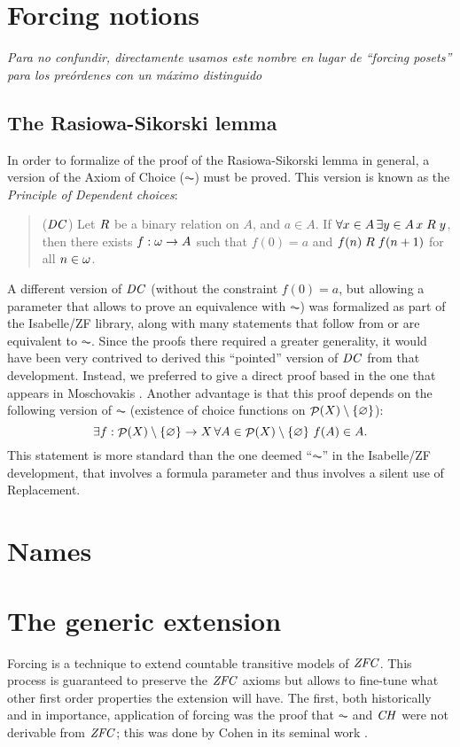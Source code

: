 \documentclass[9pt]{entcs} \usepackage{entcsmacro}
\begin{document}
\section{Forcing notions}\label{sec:forcing-posets}
\textit{Para no confundir, directamente usamos este nombre en lugar de
  ``forcing posets'' para los preórdenes con un máximo distinguido}

\subsection{The Rasiowa-Sikorski lemma}
In order to formalize of the proof of the Rasiowa-Sikorski lemma in
general, a version of the Axiom of Choice ($\AC$) must be proved. This
version is known as the \emph{Principle of Dependent choices}:
\begin{quote}
  ($\mathit{DC}$) Let $\mathrel{R}$ be a binary relation on $A$, and $a\in A$. If
  $\forall x\in A\,  \exists y\in A\, x\mathrel{R} y$, then there exists
  $f:\omega\to A$ such that $f(0)=a$ and $f(n)\mathrel{R} f(n+1)$ for all
  $n\in\omega$.
\end{quote}

A different version of $\mathit{DC}$ (without the constraint $f(0)=a$, but
allowing a parameter that allows to prove an equivalence with $\AC$) was
formalized as part of the Isabelle/ZF library, along with many
statements that follow from or are equivalent to $\AC$. Since the
proofs there required a greater generality, it would have been very
contrived to derived this ``pointed'' version of $\mathit{DC}$ from that
development. Instead, we preferred to give a direct proof based in the
one that appears in Moschovakis \cite{moschovakis1994notes}. Another
advantage is that this proof depends on the following version of $\AC$
(existence of choice functions on $\mathop{\mathcal{P}}(X)\setminus \{\varnothing\}$):
\[
\exists f:\mathop{\mathcal{P}}(X)\setminus \{\varnothing\}\to X \, \forall A\in \mathop{\mathcal{P}}(X)\setminus \{\varnothing\}\ f(A)
    \in A.
\]
This statement is more standard than the one deemed ``$\AC$'' in the
Isabelle/ZF development, that involves a formula parameter and thus
involves a silent use of Replacement.


\section{Names}


\section{The generic extension}
Forcing is a technique to extend countable transitive models of
$\mathit{ZFC}$. This process is guaranteed to preserve the $\mathit{ZFC}$
axioms but allows to fine-tune what other first order properties the
extension will have. The first, both historically and in importance,
application of forcing was the proof that $\AC$ and $\mathit{CH}$ were not
derivable from $\mathit{ZFC}$; this was done by Cohen in its seminal work
\cite{Cohen-CH-PNAS}.
\end{document}

